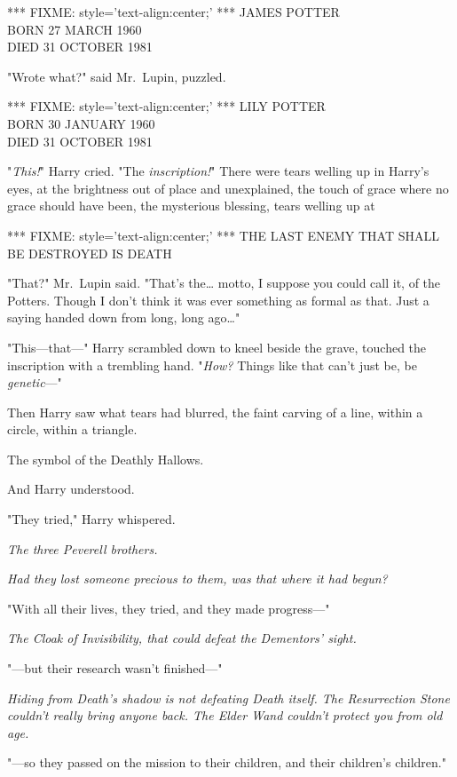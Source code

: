 *** FIXME: style='text-align:center;' ***
JAMES POTTER\\
BORN 27 MARCH 1960\\
DIED 31 OCTOBER 1981

"Wrote what?" said Mr.~Lupin, puzzled.

*** FIXME: style='text-align:center;' ***
LILY POTTER\\
BORN 30 JANUARY 1960\\
DIED 31 OCTOBER 1981

"\emph{This!}" Harry cried. "The \emph{inscription!}" There were tears welling 
up in Harry's eyes, at the brightness out of place and unexplained, the touch 
of grace where no grace should have been, the mysterious blessing, tears 
welling up at

*** FIXME: style='text-align:center;' ***
THE LAST ENEMY THAT SHALL BE DESTROYED IS DEATH

"That?" Mr.~Lupin said. "That's the{\ldots} motto, I suppose you could call it, 
of the Potters. Though I don't think it was ever something as formal as that. 
Just a saying handed down from long, long ago{\ldots}"

"This---that---" Harry scrambled down to kneel beside the grave, touched the 
inscription with a trembling hand. "\emph{How?} Things like that can't just be, 
be \emph{genetic}---"

Then Harry saw what tears had blurred, the faint carving of a line, within a 
circle, within a triangle.

The symbol of the Deathly Hallows.

And Harry understood.

"They tried," Harry whispered.

\emph{The three Peverell brothers.}

\emph{Had they lost someone precious to them, was that where it had begun?}

"With all their lives, they tried, and they made progress---"

\emph{The Cloak of Invisibility, that could defeat the Dementors' sight.}

"---but their research wasn't finished---"

\emph{Hiding from Death's shadow is not defeating Death itself. The 
Resurrection Stone couldn't really bring anyone back. The Elder Wand couldn't 
protect you from old age.}

"---so they passed on the mission to their children, and their children's 
children."

